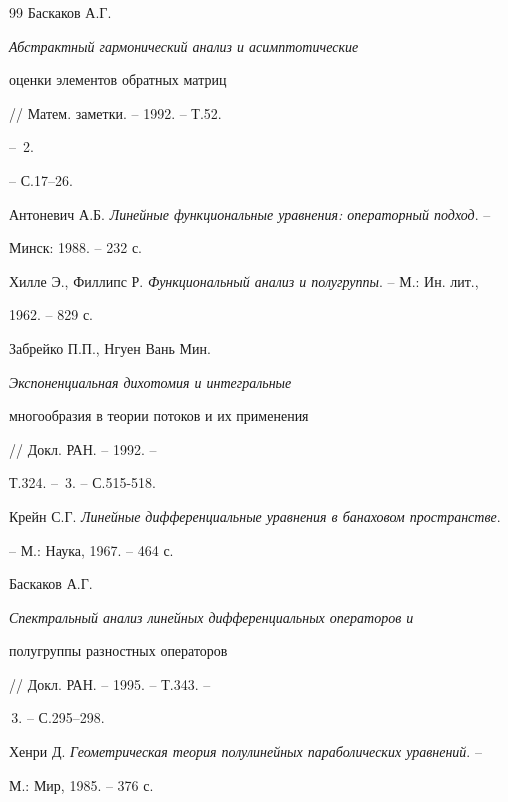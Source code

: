 \begin{thebibliography}{99}
Баскаков А.Г. {\em Абстрактный гармонический анализ и асимптотические


оценки элементов обратных матриц} // Матем. заметки. -- 1992. -- Т.52.


-- \No\,2. 


-- С.17--26. 


 




Антоневич А.Б. {\em Линейные функциональные уравнения: операторный подход}. -- 


Минск: 1988. -- 232 с. 


 




Хилле Э., Филлипс Р. {\em Функциональный анализ и полугруппы}. -- М.: Ин. лит., 


1962. -- 829 с. 


 




Забрейко П.П., Нгуен Вань Мин. {\em Экспоненциальная дихотомия и интегральные 


многообразия в теории потоков и их применения} // Докл. РАН. -- 1992. -- 


Т.324. -- \No\,3. -- С.515-518. 


 




Крейн С.Г. {\em Линейные дифференциальные уравнения в банаховом пространстве}.


--  М.: Наука, 1967. -- 464 с. 


 




Баскаков А.Г. {\em Спектральный анализ линейных дифференциальных операторов и 


полугруппы разностных операторов} // Докл. РАН. -- 1995. -- Т.343. -- 


\No\,3. -- С.295--298. 


 




Хенри Д. {\em Геометрическая теория полулинейных параболических уравнений}. -- 


М.: Мир, 1985. -- 376 с. 


 


 


\end{thebibliography} 


 


\vskip 2cm 


 






 


 


